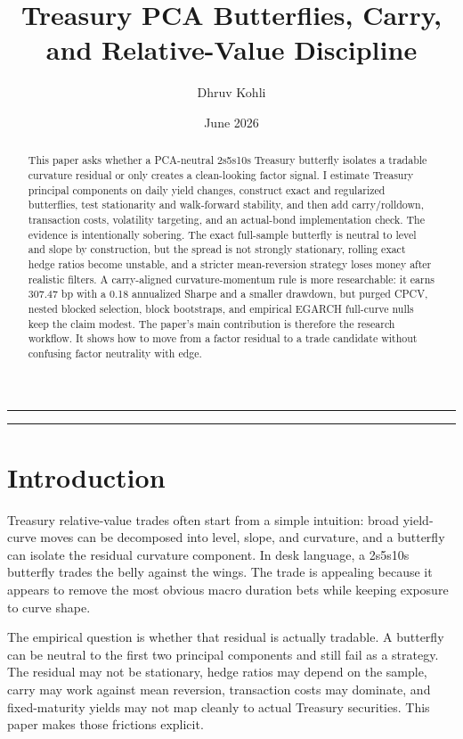 \documentclass[12pt]{article}
\title{\vspace{-0.6cm}Treasury PCA Butterflies, Carry, and Relative-Value Discipline}
\author{Dhruv Kohli}
\date{June 2026}
\begin{document}
\maketitle
\vspace{-0.4cm}
\noindent\rule{\textwidth}{0.4pt}

\begin{abstract}
This paper asks whether a PCA-neutral 2s5s10s Treasury butterfly isolates a tradable
curvature residual or only creates a clean-looking factor signal. I estimate Treasury
principal components on daily yield changes, construct exact and regularized butterflies, test
stationarity and walk-forward stability, and then add carry/rolldown, transaction costs,
volatility targeting, and an actual-bond implementation check. The evidence is intentionally
sobering. The exact full-sample butterfly is neutral to level and slope by construction, but the
spread is not strongly stationary, rolling exact hedge ratios become unstable, and a stricter
mean-reversion strategy loses money after realistic filters. A carry-aligned curvature-momentum
rule is more researchable: it earns 307.47 bp with a 0.18 annualized Sharpe and a smaller
drawdown, but purged CPCV, nested blocked selection, block bootstraps, and empirical
EGARCH full-curve nulls keep the claim modest. The paper's main contribution is therefore the
research workflow. It shows how to move
from a factor residual to a trade candidate without confusing factor neutrality with edge.
\end{abstract}

\noindent\rule{\textwidth}{0.4pt}

\section{Introduction}

Treasury relative-value trades often start from a simple intuition: broad yield-curve moves can be
decomposed into level, slope, and curvature, and a butterfly can isolate the residual curvature
component. In desk language, a 2s5s10s butterfly trades the belly against the wings. The trade is
appealing because it appears to remove the most obvious macro duration bets while keeping
exposure to curve shape.

The empirical question is whether that residual is actually tradable. A butterfly can be neutral to
the first two principal components and still fail as a strategy. The residual may not be stationary,
hedge ratios may depend on the sample, carry may work against mean reversion, transaction costs
may dominate, and fixed-maturity yields may not map cleanly to actual Treasury securities. This
paper makes those frictions explicit.
\end{document}
